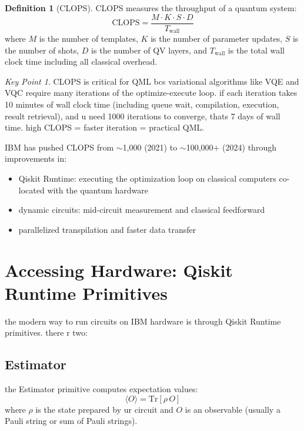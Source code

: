 \documentclass[11pt,a4paper]{article}
\theoremstyle{definition}
\newtheorem{definition}{Definition}[section]
\theoremstyle{remark}
\newtheorem*{keypoint}{Key Point}
\begin{document}
\begin{definition}[CLOPS]
CLOPS measures the throughput of a quantum system:
\[
\text{CLOPS} = \frac{M \cdot K \cdot S \cdot D}{T_{\text{wall}}}
\]
where $M$ is the number of templates, $K$ is the number of parameter updates, $S$ is the number of shots, $D$ is the number of QV layers, and $T_{\text{wall}}$ is the total wall clock time including all classical overhead.
\end{definition}

\begin{keypoint}
CLOPS is critical for QML bcs variational algorithms like VQE and VQC require many iterations of the optimize-execute loop. if each iteration takes 10 minutes of wall clock time (including queue wait, compilation, execution, result retrieval), and u need 1000 iterations to converge, thats 7 days of wall time. high CLOPS = faster iteration = practical QML.
\end{keypoint}

IBM has pushed CLOPS from $\sim$1,000 (2021) to $\sim$100,000+ (2024) through improvements in:
\begin{itemize}[leftmargin=*]
    \item Qiskit Runtime: executing the optimization loop on classical computers co-located with the quantum hardware
    \item dynamic circuits: mid-circuit measurement and classical feedforward
    \item parallelized transpilation and faster data transfer
\end{itemize}

\section{Accessing Hardware: Qiskit Runtime Primitives}

the modern way to run circuits on IBM hardware is through Qiskit Runtime primitives. there r two:

\subsection{Estimator}

the Estimator primitive computes expectation values:
\[
\langle O \rangle = \text{Tr}[\rho \, O]
\]
where $\rho$ is the state prepared by ur circuit and $O$ is an observable (usually a Pauli string or sum of Pauli strings).
\end{document}
